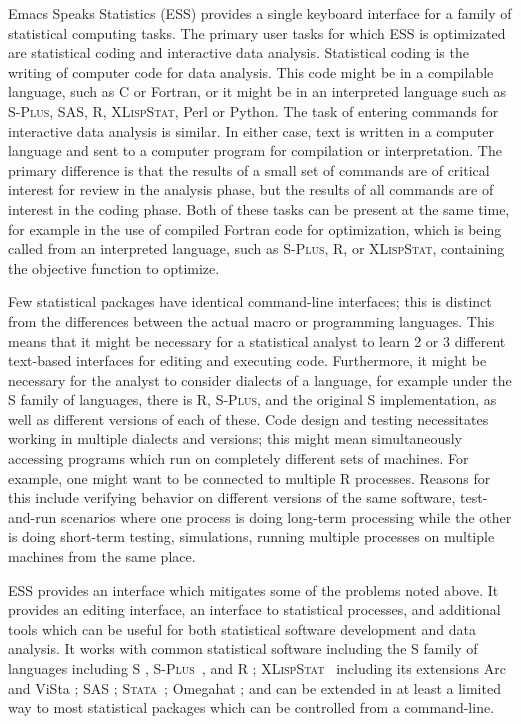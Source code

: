 \documentclass{article}
\newcommand*{\Splus}{\textsc{S-Plus}}
\newcommand*{\XLispStat}{\textsc{XLispStat}}
\newcommand*{\Stata}{\textsc{Stata}}
\begin{document}
Emacs Speaks Statistics (ESS) provides a single keyboard interface for
a family of statistical computing tasks.  The primary user tasks for which
ESS is optimizated are statistical coding
and interactive data analysis.  Statistical coding is the writing of
computer code for data analysis.  This code might be in a compilable
language, such as C or Fortran, or it might be in an interpreted
language such as \Splus, SAS, R, \XLispStat, Perl or Python.  The task
of entering commands for interactive data analysis is similar.  In
either case, text is written in a computer language and sent to a
computer program for compilation or interpretation.  The primary
difference is that the results of a small set of commands are of
critical interest for review in the analysis phase, but the results of
all commands are of interest in the coding phase.  Both of these tasks
can be present at the same time, for example in the use of compiled
Fortran code for optimization, which is being called from an
interpreted language, such as \Splus, R, or \XLispStat, containing the
objective function to optimize.

Few statistical packages have identical command-line interfaces; this
is distinct from the differences between the actual macro or
programming languages.  This means that it might be necessary for a
statistical analyst to learn 2 or 3 different text-based interfaces
for editing and executing code.  Furthermore, it might be necessary
for the analyst to consider dialects of a language, for example under
the S family of languages, there is R, \Splus, and the original S
implementation, as well as different versions of each of these.  Code
design and testing necessitates working in multiple dialects and
versions; this might mean simultaneously accessing programs which run
on completely different sets of machines.  For example, one might want
to be connected to multiple R processes.  Reasons for this include
verifying behavior on different versions of the same software,
test-and-run scenarios where one process is doing long-term processing
while the other is doing short-term testing, simulations, running
multiple processes on multiple machines from the same place.

ESS provides an interface which mitigates some of the problems noted
above.  It provides an editing interface, an interface to statistical
processes, and additional tools which can be useful for both
statistical software development and data analysis.  It works with
common statistical software including the S family of languages
including S \citep{BecRCW88,ChaJH92,ChaJ98}, \Splus\ \citep{Splus},
and R \citep{ihak:gent:1996}; \XLispStat\ \citep{Tier90} including its
extensions Arc \citep{Cook:Weisberg:1999} and ViSta
\citep{youn:fald:mcfa:1992}; SAS \citep{SAS:8.0}; \Stata\
\citep{Stata:6.0}; Omegahat \citep{DTLang:2000}; and can be extended
in at least a limited way to most statistical packages which can be
controlled from a command-line.
\end{document}
